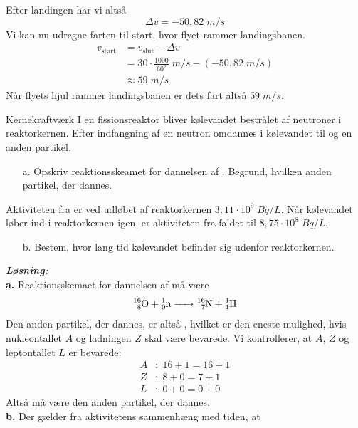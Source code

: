 \documentclass{report}
\newcommand{\sol}{\setlength{\parindent}{0cm}\textbf{\textit{Løsning:}}\setlength{\parindent}{1cm}}
\begin{document}
Efter landingen har vi altså 
\[
\Delta v =-50,82 \;\unit{m/s} 
\] 
Vi kan nu udregne farten til start, hvor flyet rammer landingsbanen.
\begin{equation*}
\begin{split}
  v _{\text{start} }&=v _{\text{slut} } - \Delta v \\
  &=30 \cdot \frac{1000}{60^2} \;\unit{m/s} - \left(-50,82 \;\unit{m/s} \right) \\
  &\approx 59 \;\unit{m/s} 
\end{split}
\end{equation*}
Når flyets hjul rammer landingsbanen er dets fart altså $59 \;\unit{m/s} $.
\begin{question}{Kernekraftværk}{}
  I en fissionsreaktor bliver kølevandet bestrålet af neutroner i reaktorkernen.
  Efter indfangning af en neutron omdannes  i kølevandet til  og en anden partikel.
  \begin{itemize}
    \item[a.] Opskriv reaktionsskeamet for dannelsen af . Begrund, hvilken anden partikel, der dannes.
  \end{itemize}
Aktiviteten fra  er ved udløbet af reaktorkernen $3,11 \cdot 10 ^{9} \;\unit{Bq/L} $. 
Når kølevandet løber ind i reaktorkernen igen, er aktiviteten fra  faldet til $8,75 \cdot 10 ^{8} \;\unit{Bq/L} $.
\begin{itemize}
  \item[b.] Bestem, hvor lang tid kølevandet befinder sig udenfor reaktorkernen.
\end{itemize}
\end{question}
\sol \\
\textbf{a.}
Reaktionsskemaet for dannelsen af  må være
\[
\ce{^16_8O + ^1_0n -> ^16_7N + ^1_1H} 
\] 
Den anden partikel, der dannes, er altså , hvilket er den eneste mulighed, hvis nukleontallet $A$ og ladningen $Z$ skal være bevarede.
Vi kontrollerer, at $A$, $Z$ og leptontallet $L$ er bevarede:
\begin{equation*}
\begin{split}
  A&:\; 16 + 1 = 16 +1\\
  Z&:\; 8 + 0 = 7 + 1\\
  L&:\; 0 + 0 = 0 + 0
\end{split}
\end{equation*}
Altså må  være den anden partikel, der dannes.\\[1ex]
\textbf{b.}
Der gælder fra aktivitetens sammenhæng med tiden, at 
\end{document}
